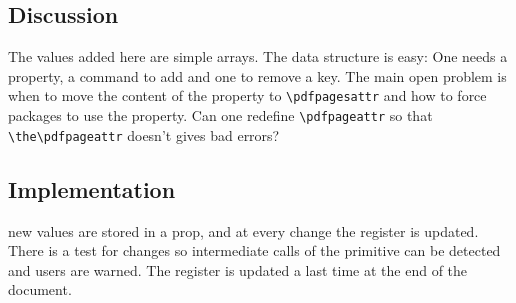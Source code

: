 \documentclass{article}
\begin{document}
\subsection{Discussion}

The values added here are simple arrays. The data structure is easy: One needs a property, a command to add and one to remove a key. The main open problem is when to move the content of the property to \verb`\pdfpagesattr` and how to force packages to use the property. Can one redefine \verb+\pdfpageattr+ so that \verb+\the\pdfpageattr+ doesn't gives bad errors?

\subsection{Implementation}
new values are stored in a prop, and at every change the register is updated. There is a test for changes so intermediate calls of the primitive can be detected and users are warned. The register is updated a last time at the end of the document.
\end{document}
